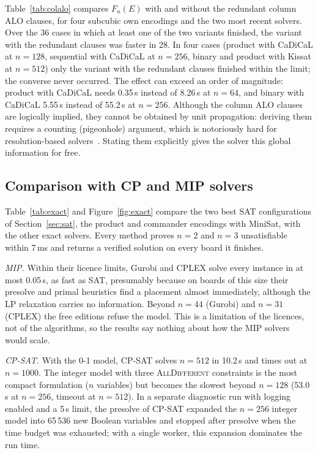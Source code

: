 \documentclass[a4paper,fleqn]{cas-sc}
\newcommand{\TO}{\textsc{to}\xspace}
\begin{document}
Table~\ref{tab:colalo} compares $F_n(E)$ with and without the redundant column ALO clauses, for four subcubic own encodings and the two most recent solvers. Over the 36 cases in which at least one of the two variants finished, the variant with the redundant clauses was faster in 28. In four cases (product with CaDiCaL at $n=128$, sequential with CaDiCaL at $n=256$, binary and product with Kissat at $n=512$) only the variant with the redundant clauses finished within the limit; the converse never occurred. The effect can exceed an order of magnitude: product with CaDiCaL needs 0.35\,s instead of 8.26\,s at $n=64$, and binary with CaDiCaL 5.55\,s instead of 55.2\,s at $n=256$. Although the column ALO clauses are logically implied, they cannot be obtained by unit propagation: deriving them requires a counting (pigeonhole) argument, which is notoriously hard for resolution-based solvers~\citep{haken1985intractability}. Stating them explicitly gives the solver this global information for free.

\begin{table}[pos=!htb]
\caption{Solver time (s) with and without the redundant column ALO clauses. \TO: timeout; ``--'': not attempted after a timeout at a smaller $n$.}\label{tab:colalo}
\centering\small

\end{table}

\subsection{Comparison with CP and MIP solvers}

Table~\ref{tab:exact} and Figure~\ref{fig:exact} compare the two best SAT configurations of Section~\ref{sec:sat}, the product and commander encodings with MiniSat, with the other exact solvers. Every method proves $n=2$ and $n=3$ unsatisfiable within 7\,ms and returns a verified solution on every board it finishes.

\emph{MIP.} Within their licence limits, Gurobi and CPLEX solve every instance in at most 0.05\,s, as fast as SAT, presumably because on boards of this size their presolve and primal heuristics find a placement almost immediately, although the LP relaxation carries no information. Beyond $n=44$ (Gurobi) and $n=31$ (CPLEX) the free editions refuse the model. This is a limitation of the licences, not of the algorithms, so the results say nothing about how the MIP solvers would scale.

\emph{CP-SAT.} With the 0-1 model, CP-SAT solves $n=512$ in 10.2\,s and times out at $n=1000$. The integer model with three \textsc{AllDifferent} constraints is the most compact formulation ($n$ variables) but becomes the slowest beyond $n=128$ (53.0\,s at $n=256$, timeout at $n=512$). In a separate diagnostic run with logging enabled and a 5\,s limit, the presolve of CP-SAT expanded the $n=256$ integer model into 65\,536 new Boolean variables and stopped after presolve when the time budget was exhausted; with a single worker, this expansion dominates the run time.
\end{document}
